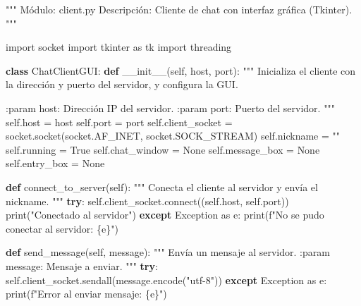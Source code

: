 \documentclass[
  a4paper,
  DIV=11,
  numbers=noendperiod,
  onepage,
  openany]{scrreprt}
\newenvironment{Shaded}{\begin{snugshade}}{\end{snugshade}}
\newcommand{\BuiltInTok}[1]{\textcolor[rgb]{0.00,0.23,0.31}{#1}}
\newcommand{\CommentTok}[1]{\textcolor[rgb]{0.37,0.37,0.37}{#1}}
\newcommand{\ControlFlowTok}[1]{\textcolor[rgb]{0.00,0.23,0.31}{\textbf{#1}}}
\newcommand{\ExtensionTok}[1]{\textcolor[rgb]{0.00,0.23,0.31}{#1}}
\newcommand{\FunctionTok}[1]{\textcolor[rgb]{0.28,0.35,0.67}{#1}}
\newcommand{\ImportTok}[1]{\textcolor[rgb]{0.00,0.46,0.62}{#1}}
\newcommand{\KeywordTok}[1]{\textcolor[rgb]{0.00,0.23,0.31}{\textbf{#1}}}
\newcommand{\NormalTok}[1]{\textcolor[rgb]{0.00,0.23,0.31}{#1}}
\newcommand{\OperatorTok}[1]{\textcolor[rgb]{0.37,0.37,0.37}{#1}}
\newcommand{\PreprocessorTok}[1]{\textcolor[rgb]{0.68,0.00,0.00}{#1}}
\newcommand{\SpecialCharTok}[1]{\textcolor[rgb]{0.37,0.37,0.37}{#1}}
\newcommand{\SpecialStringTok}[1]{\textcolor[rgb]{0.13,0.47,0.30}{#1}}
\newcommand{\StringTok}[1]{\textcolor[rgb]{0.13,0.47,0.30}{#1}}
\newcommand{\VariableTok}[1]{\textcolor[rgb]{0.07,0.07,0.07}{#1}}
\begin{document}
\begin{Shaded}
\begin{Highlighting}[]
\CommentTok{"""}
\CommentTok{Módulo: client.py}
\CommentTok{Descripción: Cliente de chat con interfaz gráfica (Tkinter).}
\CommentTok{"""}

\ImportTok{import}\NormalTok{ socket}
\ImportTok{import}\NormalTok{ tkinter }\ImportTok{as}\NormalTok{ tk}
\ImportTok{import}\NormalTok{ threading}


\KeywordTok{class}\NormalTok{ ChatClientGUI:}
    \KeywordTok{def} \FunctionTok{\_\_init\_\_}\NormalTok{(}\VariableTok{self}\NormalTok{, host, port):}
        \CommentTok{"""}
\CommentTok{        Inicializa el cliente con la dirección y puerto del servidor, y configura la GUI.}

\CommentTok{        :param host: Dirección IP del servidor.}
\CommentTok{        :param port: Puerto del servidor.}
\CommentTok{        """}
        \VariableTok{self}\NormalTok{.host }\OperatorTok{=}\NormalTok{ host}
        \VariableTok{self}\NormalTok{.port }\OperatorTok{=}\NormalTok{ port}
        \VariableTok{self}\NormalTok{.client\_socket }\OperatorTok{=}\NormalTok{ socket.socket(socket.AF\_INET, socket.SOCK\_STREAM)}
        \VariableTok{self}\NormalTok{.nickname }\OperatorTok{=} \StringTok{""}
        \VariableTok{self}\NormalTok{.running }\OperatorTok{=} \VariableTok{True}
        \VariableTok{self}\NormalTok{.chat\_window }\OperatorTok{=} \VariableTok{None}
        \VariableTok{self}\NormalTok{.message\_box }\OperatorTok{=} \VariableTok{None}
        \VariableTok{self}\NormalTok{.entry\_box }\OperatorTok{=} \VariableTok{None}

    \KeywordTok{def}\NormalTok{ connect\_to\_server(}\VariableTok{self}\NormalTok{):}
        \CommentTok{"""}
\CommentTok{        Conecta el cliente al servidor y envía el nickname.}
\CommentTok{        """}
        \ControlFlowTok{try}\NormalTok{:}
            \VariableTok{self}\NormalTok{.client\_socket.}\ExtensionTok{connect}\NormalTok{((}\VariableTok{self}\NormalTok{.host, }\VariableTok{self}\NormalTok{.port))}
            \BuiltInTok{print}\NormalTok{(}\StringTok{"Conectado al servidor"}\NormalTok{)}
        \ControlFlowTok{except} \PreprocessorTok{Exception} \ImportTok{as}\NormalTok{ e:}
            \BuiltInTok{print}\NormalTok{(}\SpecialStringTok{f"No se pudo conectar al servidor: }\SpecialCharTok{\{}\NormalTok{e}\SpecialCharTok{\}}\SpecialStringTok{"}\NormalTok{)}

    \KeywordTok{def}\NormalTok{ send\_message(}\VariableTok{self}\NormalTok{, message):}
        \CommentTok{"""}
\CommentTok{        Envía un mensaje al servidor.}
\CommentTok{        :param message: Mensaje a enviar.}
\CommentTok{        """}
        \ControlFlowTok{try}\NormalTok{:}
            \VariableTok{self}\NormalTok{.client\_socket.sendall(message.encode(}\StringTok{"utf{-}8"}\NormalTok{))}
        \ControlFlowTok{except} \PreprocessorTok{Exception} \ImportTok{as}\NormalTok{ e:}
            \BuiltInTok{print}\NormalTok{(}\SpecialStringTok{f"Error al enviar mensaje: }\SpecialCharTok{\{}\NormalTok{e}\SpecialCharTok{\}}\SpecialStringTok{"}\NormalTok{)}


\end{Highlighting}
\end{Shaded}
\end{document}
